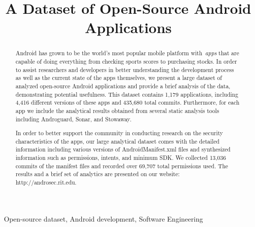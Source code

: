 \documentclass[conference]{IEEEtran}
\begin{document}



\title{A Dataset of Open-Source Android Applications}

\author{


}

\maketitle
\begin{abstract}



Android has grown to be the world's most popular mobile platform with~\emph{apps} that are capable of doing everything from checking sports scores to purchasing stocks. In order to assist researchers and developers in better understanding the development process as well as the current state of the apps themselves, we present a large dataset of analyzed open-source Android applications and provide a brief analysis of the data, demonstrating potential usefulness. This dataset contains 1,179 applications, including 4,416 different versions of these apps and 435,680 total commits. Furthermore, for each app we include the analytical results obtained from several static analysis tools including Androguard, Sonar, and Stowaway.

In order to better support the community in conducting research on the security characteristics of the apps, our large analytical dataset comes with the detailed information including various versions of AndroidManifest.xml files and synthesized information such as permissions, intents, and minimum SDK. We collected 13,036 commits of the manifest files and recorded over 69,707 total permissions used.
The results and a brief set of analytics are presented on our website: http://androsec.rit.edu.
\end{abstract}


\begin{keywords}
Open-source dataset, Android development, Software Engineering

\end{keywords} 
\end{document}
